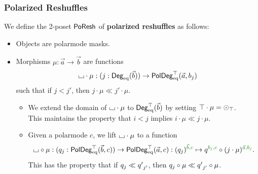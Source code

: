 \documentclass[a4paper]{memoir}
\begin{document}
\subsubsection{Polarized Reshuffles}
\begin{definition}\label{def:poreshcat}
	We define the 2-poset $\poreshcat$ of \textbf{polarized reshuffles} as follows:
	\begin{itemize}
		\item Objects are polarmode masks.
		\item Morphisms $\mu : \vec a \to \vec b$ are functions
		\[
			\loch \cdot \mu : (j : \Degeq(\vec b)) \to \poldegeqtop(\vec a, b_j)
		\]
		such that if $j < j'$, then $j \cdot \mu \ll j' \cdot \mu$.
		\begin{itemize}
			\item We extend the domain of $\loch \cdot \mu$ to $\Degeqtop(\vec b)$ by setting $\top \cdot \mu = \dpol \top \nonpol$. \\
			This maintains the property that $i < j$ implies $i \cdot \mu \ll j \cdot \mu$.
			\item Given a polarmode $c$, we lift $\loch \cdot \mu$ to a function
			\begin{equation} \label{eq:poldeg-poresh}
				\loch \circ \mu : (\dpol j q : \poldegeqtop(\vec b, c)) \to \poldegeqtop(\vec a, c) : (\dpol j q)\pmrhom{\vec b}{c} \mapsto q\pmrhom{b_j}{c} \circ (j \cdot \mu)\pmrhom{\vec a}{b_j}.
			\end{equation}
			This has the property that if $\dpol j q \ll \dpol{{j'}}{q'}$, then $\dpol j q \circ \mu \ll \dpol{{j'}}{q'} \circ \mu$.

\end{itemize}
\end{itemize}
\end{definition}
\end{document}
